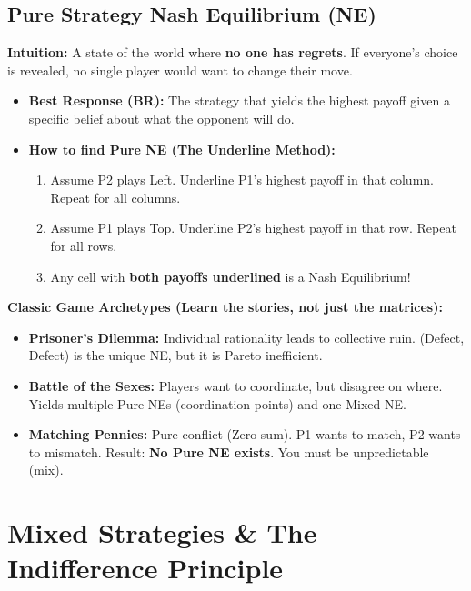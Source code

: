 \documentclass[12pt, a4paper]{article}
\begin{document}
\subsection{Pure Strategy Nash Equilibrium (NE)}
\textbf{Intuition:} A state of the world where \textbf{no one has regrets}. If everyone's choice is revealed, no single player would want to change their move.
\begin{itemize}
    \item \textbf{Best Response (BR):} The strategy that yields the highest payoff given a specific belief about what the opponent will do.
    \item \textbf{How to find Pure NE (The Underline Method):}
    \begin{enumerate}
        \item Assume P2 plays Left. Underline P1's highest payoff in that column. Repeat for all columns.
        \item Assume P1 plays Top. Underline P2's highest payoff in that row. Repeat for all rows.
        \item Any cell with \textbf{both payoffs underlined} is a Nash Equilibrium!
    \end{enumerate}
\end{itemize}

\begin{notebox}
  \textbf{Classic Game Archetypes (Learn the stories, not just the matrices):}
  \begin{itemize}
      \item \textbf{Prisoner's Dilemma:} Individual rationality leads to collective ruin. (Defect, Defect) is the unique NE, but it is Pareto inefficient.
      \item \textbf{Battle of the Sexes:} Players want to coordinate, but disagree on where. Yields multiple Pure NEs (coordination points) and one Mixed NE.
      \item \textbf{Matching Pennies:} Pure conflict (Zero-sum). P1 wants to match, P2 wants to mismatch. Result: \textbf{No Pure NE exists}. You must be unpredictable (mix).
  \end{itemize}
\end{notebox}

\section{Mixed Strategies \& The Indifference Principle}
\end{document}
